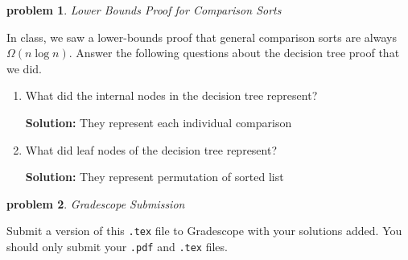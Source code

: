 \documentclass[10pt]{article}
\newtheorem{problem}{\sc\color{cit}problem}
\begin{document}
\begin{problem} Lower Bounds Proof for Comparison Sorts \end{problem}

In class, we saw a lower-bounds proof that general comparison sorts are always $\Omega(n \log n)$. Answer the following questions about the decision tree proof that we did.
    \begin{enumerate}   
    	\item What did the internal nodes in the decision tree represent?
    	
    	\textbf{Solution:}  They represent each individual comparison

        \item What did leaf nodes of the decision tree represent?
        
        \textbf{Solution:}  They represent permutation of sorted list
        
    \end{enumerate}

\begin{problem} Gradescope Submission \end{problem}
Submit a version of this \verb|.tex| file to Gradescope with your solutions added.  You should only submit your \verb|.pdf| and \verb|.tex| files.

%
%
\end{document}
